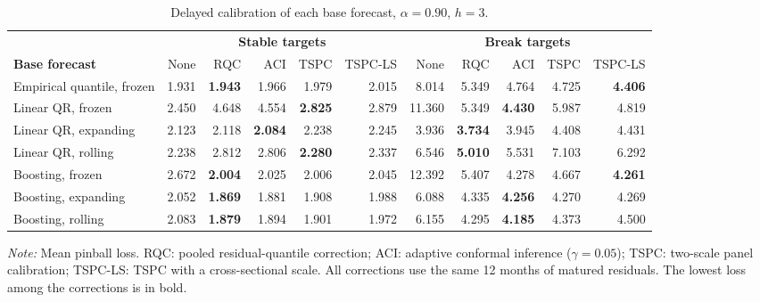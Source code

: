 \begin{table}[t]
\caption{Delayed calibration of each base forecast, $\alpha=0.90$, $h=3$.\label{tab:tspc}}
\centering\footnotesize\setlength{\tabcolsep}{3pt}
\begin{tabular*}{\textwidth}{@{\extracolsep\fill}lrrrrrrrrrr@{}}
\toprule
 & \multicolumn{5}{c}{\textbf{Stable targets}} & \multicolumn{5}{c}{\textbf{Break targets}} \\
\cmidrule(lr){2-6}\cmidrule(l){7-11}
\textbf{Base forecast} & None & RQC & ACI & TSPC & TSPC-LS & None & RQC & ACI & TSPC & TSPC-LS \\
\midrule
Empirical quantile, frozen & 1.931 & \textbf{1.943} & 1.966 & 1.979 & 2.015 & 8.014 & 5.349 & 4.764 & 4.725 & \textbf{4.406} \\
Linear QR, frozen & 2.450 & 4.648 & 4.554 & \textbf{2.825} & 2.879 & 11.360 & 5.349 & \textbf{4.430} & 5.987 & 4.819 \\
Linear QR, expanding & 2.123 & 2.118 & \textbf{2.084} & 2.238 & 2.245 & 3.936 & \textbf{3.734} & 3.945 & 4.408 & 4.431 \\
Linear QR, rolling & 2.238 & 2.812 & 2.806 & \textbf{2.280} & 2.337 & 6.546 & \textbf{5.010} & 5.531 & 7.103 & 6.292 \\
Boosting, frozen & 2.672 & \textbf{2.004} & 2.025 & 2.006 & 2.045 & 12.392 & 5.407 & 4.278 & 4.667 & \textbf{4.261} \\
Boosting, expanding & 2.052 & \textbf{1.869} & 1.881 & 1.908 & 1.988 & 6.088 & 4.335 & \textbf{4.256} & 4.270 & 4.269 \\
Boosting, rolling & 2.083 & \textbf{1.879} & 1.894 & 1.901 & 1.972 & 6.155 & 4.295 & \textbf{4.185} & 4.373 & 4.500 \\
\bottomrule
\end{tabular*}
\begin{tablenotes}
\item \textit{Note:} Mean pinball loss. RQC: pooled residual-quantile correction; ACI: adaptive conformal inference ($\gamma=0.05$); TSPC: two-scale panel calibration; TSPC-LS: TSPC with a cross-sectional scale. All corrections use the same 12 months of matured residuals. The lowest loss among the corrections is in bold.
\end{tablenotes}
\end{table}
